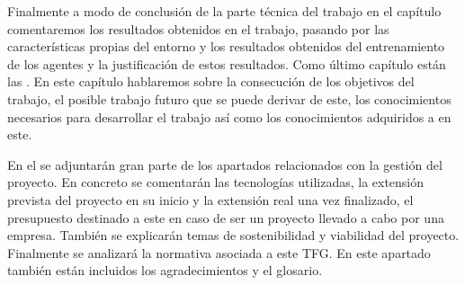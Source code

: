 Finalmente a modo de conclusión de la parte técnica del trabajo en el capítulo  comentaremos los resultados obtenidos en el trabajo, pasando por las características propias del entorno y los resultados obtenidos del entrenamiento de los agentes y la justificación de estos resultados. Como último capítulo están las . En este capítulo hablaremos sobre la consecución de los objetivos del trabajo, el posible trabajo futuro que se puede derivar de este, los conocimientos necesarios para desarrollar el trabajo así como los conocimientos adquiridos a en este.



En el  se adjuntarán gran parte de los apartados relacionados con la gestión del proyecto. En concreto se comentarán las tecnologías utilizadas, la extensión prevista del proyecto en su inicio y la extensión real una vez finalizado, el presupuesto destinado a este en caso de ser un proyecto llevado a cabo por una empresa. También se explicarán temas de sostenibilidad y viabilidad del proyecto. Finalmente se analizará la normativa asociada a este TFG. En este apartado también están incluidos los agradecimientos y el glosario.